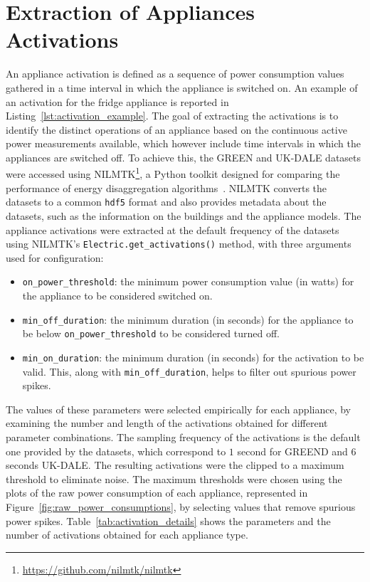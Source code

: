 \section{Extraction of Appliances Activations}

An appliance activation is defined as a sequence of power consumption values gathered in a time interval in which the appliance is switched on. An example of an activation for the fridge appliance is reported in Listing~\ref{lst:activation_example}. The goal of extracting the activations is to identify the distinct operations of an appliance based on the continuous active power measurements available, which however include time intervals in which the appliances are switched off. To achieve this, the GREEN and UK-DALE datasets were accessed using NILMTK\footnote{\url{https://github.com/nilmtk/nilmtk}}, 
a Python toolkit designed for comparing the performance of energy disaggregation algorithms~\parencite{batra_nilmtk_2014}. NILMTK converts the datasets to a common \texttt{hdf5} format and also provides metadata about the datasets, such as the information on the buildings and the appliance models. The appliance activations were extracted at the default frequency of the datasets using NILMTK’s \texttt{Electric.get\_activations()} method, with three arguments used for configuration:
\begin{itemize}
    \item \texttt{on\_power\_threshold}: the minimum power consumption value (in watts) for the appliance to be considered switched on.
    \item \texttt{min\_off\_duration}: the minimum duration (in seconds) for the appliance to be below \texttt{on\_power\_threshold} to be considered turned off.
    \item \texttt{min\_on\_duration}: the minimum duration (in seconds) for the activation to be valid. This, along with \texttt{min\_off\_duration}, helps to filter out spurious power spikes. 
\end{itemize}
The values of these parameters were selected empirically for each appliance, by examining the number and length of the activations obtained for different parameter combinations. The sampling frequency of the activations is the default one provided by the datasets, which correspond to $1$ second for GREEND and $6$ seconds UK-DALE. The resulting activations were the clipped to a maximum threshold to eliminate noise. The maximum thresholds were chosen using the plots of the raw power consumption of each appliance, represented in Figure~\ref{fig:raw_power_consumptions}, by selecting values that remove spurious power spikes. Table~\ref{tab:activation_details} shows the parameters and the number of activations obtained for each appliance type.

